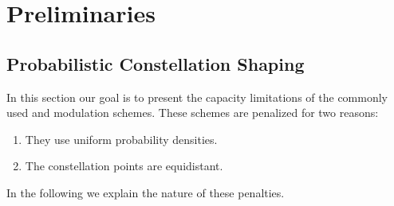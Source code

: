 \chapter{Preliminaries}\label{chap:preliminaries}
\section{Probabilistic Constellation Shaping}
In this section our goal is to present the capacity limitations of the commonly used  and  modulation schemes. These schemes are penalized for two reasons:
\begin{enumerate}
\item They use uniform probability densities.
\item The constellation points are equidistant.
\end{enumerate}
In the following we explain the nature of these penalties.
